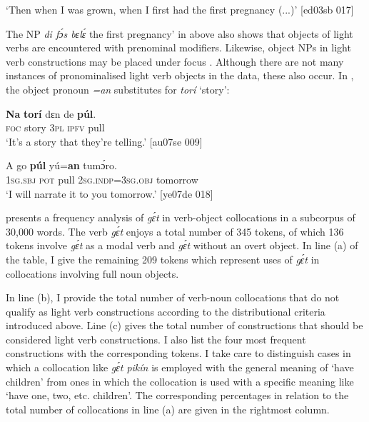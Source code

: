 \glt ‘Then when I was grown, when I first had the first pregnancy (...)’ [ed03sb 017]
\z

The NP \textit{di fɔ́s bɛlɛ́} the first pregnancy’ in  above also shows that objects of light verbs are encountered with prenominal modifiers. Likewise, object NPs in light verb constructions may be placed under focus . Although there are not many instances of pronominalised light verb objects in the data, these also occur. In , the object pronoun \textit{=an} substitutes for \textit{torí} ‘story’:


\ea%
    \label{ex:key:1164}
    \gll \textbf{Na}  \textbf{torí}    dɛn  de  \textbf{púl}.\\
\textsc{foc}  story  \textsc{3pl}  \textsc{ipfv}  pull\\

\glt ‘It’s a story that they’re telling.’ [au07se 009]
\z


\ea%
    \label{ex:key:1165}
    \gll A    go  \textbf{púl}  yú=\textbf{an}      tumɔ́ro.\\
\textsc{1sg.sbj}  \textsc{pot}  pull  \textsc{2sg.indp}=\textsc{3sg.obj}  tomorrow\\

\glt ‘I will narrate it to you tomorrow.’ [ye07de 018]
\z

 presents a frequency analysis of \textit{gɛ́t} in verb-object collocations in a subcorpus of 30,000 words. The verb \textit{gɛ́t} enjoys a total number of 345 tokens, of which 136 tokens involve \textit{gɛ́t} as a modal verb and \textit{gɛ́t} without an overt object. In line (a) of the table, I give the remaining 209 tokens which represent uses of \textit{gɛ́t} in collocations involving full noun objects.


In line (b), I provide the total number of verb-noun collocations that do not qualify as light verb constructions according to the distributional criteria introduced above. Line (c) gives the total number of constructions that should be considered light verb constructions. I also list the four most frequent constructions with the corresponding tokens. I take care to distinguish cases in which a collocation like \textit{gɛ́t pikín} is employed with the general meaning of ‘have children’ from ones in which the collocation is used with a specific meaning like ‘have one, two, etc. children’. The corresponding percentages in relation to the total number of collocations in line (a) are given in the rightmost column.


